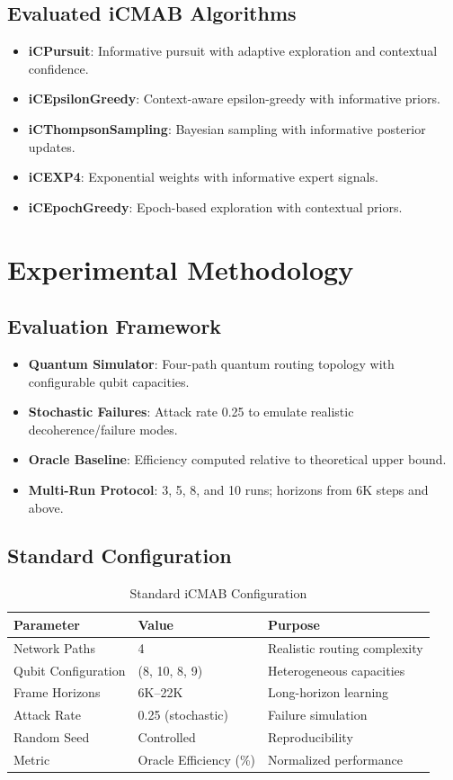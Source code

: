 \documentclass[12pt,a4paper]{article}
\begin{document}
\subsection{Evaluated iCMAB Algorithms}
\begin{itemize}
\item \textbf{iCPursuit}: Informative pursuit with adaptive exploration and contextual confidence.
\item \textbf{iCEpsilonGreedy}: Context-aware epsilon-greedy with informative priors.
\item \textbf{iCThompsonSampling}: Bayesian sampling with informative posterior updates.
\item \textbf{iCEXP4}: Exponential weights with informative expert signals.
\item \textbf{iCEpochGreedy}: Epoch-based exploration with contextual priors.
\end{itemize}

\section{Experimental Methodology}

\subsection{Evaluation Framework}
\begin{itemize}
\item \textbf{Quantum Simulator}: Four-path quantum routing topology with configurable qubit capacities.
\item \textbf{Stochastic Failures}: Attack rate 0.25 to emulate realistic decoherence/failure modes.
\item \textbf{Oracle Baseline}: Efficiency computed relative to theoretical upper bound.
\item \textbf{Multi-Run Protocol}: 3, 5, 8, and 10 runs; horizons from 6K steps and above.
\end{itemize}

\subsection{Standard Configuration}
\begin{table}[H]
\centering
\caption{Standard iCMAB Configuration}
\begin{tabular}{@{}lll@{}}
\toprule
\textbf{Parameter} & \textbf{Value} & \textbf{Purpose} \\
\midrule
Network Paths & 4 & Realistic routing complexity \\
Qubit Configuration & (8, 10, 8, 9) & Heterogeneous capacities \\
Frame Horizons & 6K–22K & Long-horizon learning \\
Attack Rate & 0.25 (stochastic) & Failure simulation \\
Random Seed & Controlled & Reproducibility \\
Metric & Oracle Efficiency (\%) & Normalized performance \\
\bottomrule
\end{tabular}
\end{table}
\end{document}
